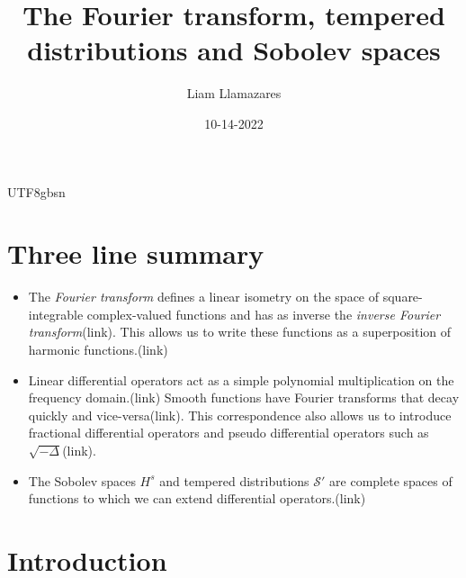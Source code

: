 \documentclass[
]{article}
\title{The Fourier transform, tempered distributions and Sobolev spaces}
\author{Liam Llamazares}
\date{10-14-2022}
\begin{document}
\maketitle

{UTF8}{gbsn}

\hypertarget{three-line-summary}{%
	\section*{\texorpdfstring{ Three line summary
	  }{ Three line summary }}\label{three-line-summary}}

\begin{itemize}
	\item
	      The \emph{Fourier transform} defines a linear isometry on the space of
	      square-integrable complex-valued functions and has as inverse the
	      \emph{inverse Fourier transform}(link). This allows us to write these
	      functions as a superposition of harmonic functions.(link)
	\item
	      Linear differential operators act as a simple polynomial
	      multiplication on the frequency domain.(link) Smooth functions have
	      Fourier transforms that decay quickly and vice-versa(link). This
	      correspondence also allows us to introduce fractional differential
	      operators and pseudo differential operators such as
	      \(\sqrt{-\Delta }\)(link).
	\item
	      The Sobolev spaces \(H^s\) and tempered distributions
	      \({\mathcal S}'\) are complete spaces of functions to which we can
	      extend differential operators.(link)
\end{itemize}

\hypertarget{introduction}{%
	\section*{Introduction}\label{introduction}}
\end{document}
